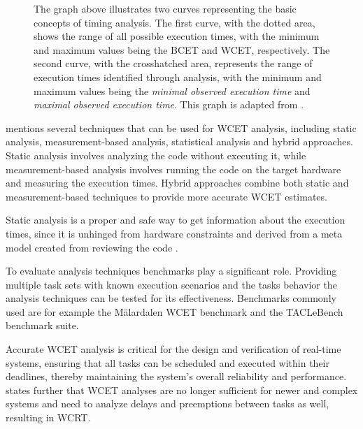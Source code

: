 \begin{figure}[htbp]
	\centering
	\resizebox{\textwidth}{!}{
		
	}
	\caption{
		The graph above illustrates two curves representing the basic concepts of timing analysis.
		The first curve, with the dotted area, shows the range of all possible execution times, with the minimum and maximum values being the \ac{BCET} and \ac{WCET}, respectively.
		The second curve, with the crosshatched area, represents the range of execution times identified through analysis, with the minimum and maximum values being the \textit{minimal observed execution time} and \textit{maximal observed execution time}.
		This graph is adapted from \textcite{wilhelmWorstcaseExecutiontimeProblem2008}.
	}
	\label{fig:overestimation}
\end{figure}

\textcite{kelterWCETAnalysisOptimization} mentions several techniques that can be used for \ac{WCET} analysis, including static analysis, measurement-based analysis, statistical analysis and hybrid approaches.
Static analysis involves analyzing the code without executing it, while measurement-based analysis involves running the code on the target hardware and measuring the execution times.
Hybrid approaches combine both static and measurement-based techniques to provide more accurate \ac{WCET} estimates.

Static analysis is a proper and safe way to get information about the execution times, since it is unhinged from hardware constraints and derived from a meta model created from reviewing the code \cite{kelterWCETAnalysisOptimization}.

To evaluate analysis techniques benchmarks play a significant role.
Providing multiple task sets with known execution scenarios and the tasks behavior the analysis techniques can be tested for its effectiveness. 
Benchmarks commonly used are for example the Mälardalen \ac{WCET} benchmark and the TACLeBench benchmark suite\cite{falkTACLeBenchBenchmarkCollection2016}.

Accurate \ac{WCET} analysis is critical for the design and verification of real-time systems, ensuring that all tasks can be scheduled and executed within their deadlines, thereby maintaining the system's overall reliability and performance\cite{kelterWCETAnalysisOptimization}.
\textcite{kelterWCETAnalysisOptimization} states further that \ac{WCET} analyses are no longer sufficient for newer and complex systems and need to analyze delays and preemptions between tasks as well, resulting in \ac{WCRT}.

